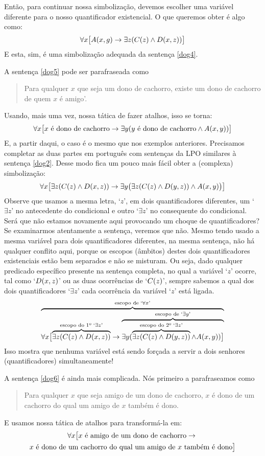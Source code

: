 Então, para continuar nossa simbolização, devemos escolher uma variável diferente para o nosso quantificador existencial. O que queremos obter é algo como:
$$\forall x\bigl[\mathord{A}(x,g) \rightarrow\exists z(\mathord{C}(z) \wedge \mathord{D}(x,z))\bigr]$$
E esta, sim, é uma simbolização adequada da sentença \ref{dog4}.

A sentença \ref{dog5} pode ser parafraseada como
\begin{quote}
	Para qualquer $x$ que seja um dono de cachorro, existe um dono de cachorro de quem $x$ é amigo'.	
\end{quote}
Usando, mais uma vez, nossa tática de fazer atalhos, isso se torna:
$$\forall x\bigl[\mbox{$x$ é dono de cachorro}\rightarrow\exists y(\mbox{$y$ é dono de cachorro}\wedge \mathord{A}(x,y))\bigr]$$
E, a partir daqui, o caso é o mesmo que nos exemplos anteriores.
Precisamos completar as duas partes em português com sentenças da LPO similares à sentença \ref{dog2}.
Desse modo fica um pouco mais fácil obter a (complexa) simbolização:
$$\forall x\bigl[\exists z(\mathord{C}(z) \wedge \mathord{D}(x,z))\rightarrow\exists y\bigl(\exists z(\mathord{C}(z) \wedge \mathord{D}(y,z))\wedge \mathord{A}(x,y)\bigr)\bigr]$$
Observe que usamos a mesma letra, `$z$', em dois quantificadores diferentes, um `$\exists z$' no antecedente do condicional e outro `$\exists z$' no consequente do condicional.
Será que não estamos novamente aqui provocando um choque de quantificadores? 
Se examinarmos atentamente a sentença, veremos que não.
Mesmo tendo usado a mesma variável para dois quantificadores diferentes, na mesma sentença, não há qualquer conflito aqui, porque os escopos (âmbitos) destes dois quantificadores existenciais estão bem separados e não se misturam.
Ou seja, dado qualquer predicado específico presente na sentença completa, no qual a variável `$z$' ocorre, tal como `$\mathord{D}(x,z)$' ou as duas ocorrências de `$\mathord{C}(z)$', sempre sabemos a qual dos dois quantificadores `$\exists z$' cada ocorrência da variável `$z$' está ligada.
$$\overbrace{\forall x\bigl[\overbrace{\exists z(\mathord{C}(z) \wedge \mathord{D}(x,z))}^{\text{escopo do 1º `}\exists z\text{'}}\rightarrow \overbrace{\exists y(\overbrace{\exists z(\mathord{C}(z) \wedge \mathord{D}(y,z))}^{\text{escopo do 2º `}\exists z\text{'}}\wedge \mathord{A}(x,y))\bigr]}^{\text{escopo de `}\exists y\text{'}}}^{\text{escopo de `}\forall x\text{'}}$$
Isso mostra que nenhuma variável está sendo forçada a servir a dois senhores (quantificadores) simultaneamente!

A sentença \ref{dog6} é ainda mais complicada.
Nós primeiro a parafraseamos como
\begin{quote}
	Para qualquer $x$ que seja amigo de um dono de cachorro, $x$ é dono de um cachorro do qual um amigo de $x$ também é dono.
\end{quote}
E usamos nossa tática de atalhos para transformá-la em:
\footnotesize
\begin{multline*}
\forall x\bigl[x\text{ é amigo de um dono de cachorro}\rightarrow {}\\
x\text{ é dono de um cachorro do qual um amigo de $x$ também é dono}\bigr]
\end{multline*}

